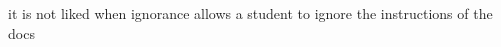 \documentclass{article}
\begin{document}
it is not liked when ignorance allows a student to ignore the instructions of the docs\cite{greenwade93} 



 
\end{document}
